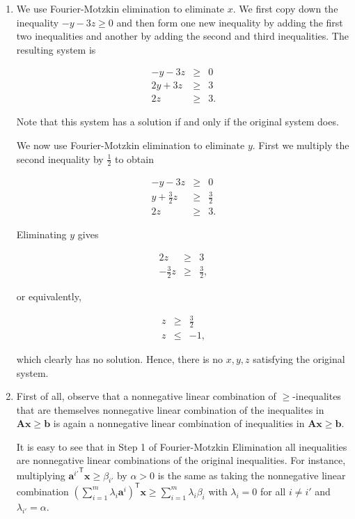 \documentclass[]{book}
\def\gt{>}
\theoremstyle{definition}
\theoremstyle{definition}
\theoremstyle{remark}
\begin{document}
\begin{enumerate}
\def\labelenumi{\arabic{enumi}.}
\item
  We use Fourier-Motzkin elimination to eliminate \(x\). We first copy
  down the inequality \(-y-3z\geq 0\) and then form one new inequality
  by adding the first two inequalities and another by adding the second
  and third inequalities. The resulting system is

  \begin{eqnarray*}
  -y - 3z & \geq & 0 \\
   2y + 3z& \geq & 3 \\
  2z & \geq & 3.
  \end{eqnarray*}

  Note that this system has a solution if and only if the original
  system does.

  We now use Fourier-Motzkin elimination to eliminate \(y\). First we
  multiply the second inequality by \(\frac{1}{2}\) to obtain

  \begin{eqnarray*}
  -y - 3z & \geq & 0 \\
   y + \frac{3}{2}z& \geq & \frac{3}{2} \\
  2z & \geq & 3.
  \end{eqnarray*}

  Eliminating \(y\) gives

  \begin{eqnarray*}
  2z & \geq & 3 \\
   - \frac{3}{2}z& \geq & \frac{3}{2},
  \end{eqnarray*}

  or equivalently,

  \begin{eqnarray*}
  z & \geq & \frac{3}{2} \\
   z& \leq & -1,
  \end{eqnarray*}

  which clearly has no solution. Hence, there is no \(x,y,z\) satisfying
  the original system.
\item
  First of all, observe that a nonnegative linear combination of
  \(\geq\)-inequalites that are themselves nonnegative linear
  combination of the inequalites in
  \(\mathbf{A}\mathbf{x}\geq \mathbf{b}\) is again a nonnegative linear
  combination of inequalities in
  \(\mathbf{A}\mathbf{x}\geq \mathbf{b}\).

  It is easy to see that in Step 1 of Fourier-Motzkin Elimination all
  inequalities are nonnegative linear combinations of the original
  inequalities. For instance, multiplying
  \({\mathbf{a}^{i'}}^\mathsf{T}\mathbf{x} \geq \beta_{i'}\) by
  \(\alpha \gt 0\) is the same as taking the nonnegative linear
  combination
  \(\displaystyle \left(\sum_{i = 1}^m \lambda_i {\mathbf{a}^{i}}\right)^\mathsf{T}\mathbf{x} \geq \sum_{i=1}^m \lambda_i \beta_i\)
  with \(\lambda_i = 0\) for all \(i \neq i'\) and
  \(\lambda_{i'} = \alpha\).


\end{enumerate}
\end{document}
